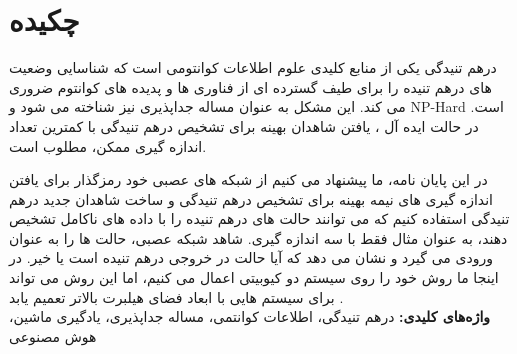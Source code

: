 
\section*{چکیده}
\begin{spacing}{2}

درهم تنیدگی یکی از منابع کلیدی علوم اطلاعات کوانتومی است که شناسایی وضعیت های درهم تنیده را برای طیف گسترده ای از فناوری ها و پدیده های کوانتوم ضروری می کند. این مشکل به عنوان مساله جداپذیری نیز شناخته می شود و NP-Hard است. در حالت ایده آل ، یافتن شاهدان بهینه برای تشخیص درهم تنیدگی با کمترین تعداد اندازه گیری ممکن، مطلوب است.

در این پایان نامه، ما پیشنهاد می کنیم از شبکه های عصبی خود رمزگذار برای یافتن اندازه گیری های نیمه بهینه برای تشخیص درهم تنیدگی و ساخت شاهدان جدید درهم تنیدگی استفاده کنیم که می توانند حالت های درهم تنیده را با داده های ناکامل تشخیص دهند، به عنوان مثال فقط با سه اندازه گیری. شاهد شبکه عصبی، حالت ها را به عنوان ورودی می گیرد و نشان می دهد که آیا حالت در خروجی درهم تنیده است یا خیر. در اینجا ما روش خود را روی سیستم دو کیوبیتی اعمال می کنیم، اما این روش می تواند برای سیستم هایی با ابعاد فضای هیلبرت بالاتر تعمیم یابد
.\\

\textbf{واژه‌های کلیدی:}
درهم تنیدگی، اطلاعات کوانتمی، مساله جداپذیری، یادگیری ماشین، هوش مصنوعی
\end{spacing}

\newpage\null\newpage
